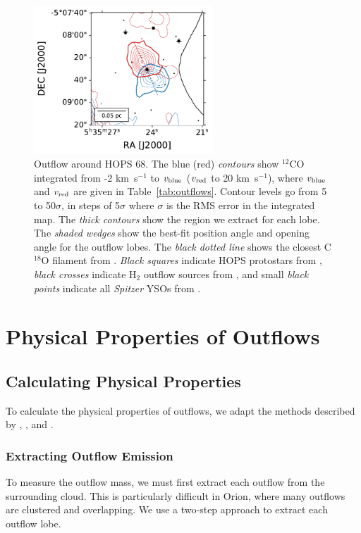 \documentclass[twocolumn]{aastex63}
\newcommand{\example}{HOPS 68}
\newcommand{\kms}{km~s$^{-1}$}
\newcommand{\co}[1][]{\ensuremath{^{#1}}CO}
\begin{document}

\begin{figure}[htb!]
\centering
\includegraphics[width=0.6\textwidth]{stamp.pdf}
\caption{Outflow around \example{}. The blue (red) \textit{contours} show \co[12]{} integrated from -2 \kms{} to $v_{\rm blue}$ ($v_{\rm red}$ to 20 \kms{}), where $v_{\rm blue}$ and $v_{\rm red}$ are given in Table~\ref{tab:outflows}. Contour levels go from 5 to 50$\sigma$, in steps of 5$\sigma$ where $\sigma$ is the RMS error in the integrated map. The \textit{thick contours} show the region we extract for each lobe. The \textit{shaded wedges} show the best-fit position angle and opening angle for the outflow lobes. The \textit{black dotted line} shows the closest C$^{18}$O filament from \citet{Suri19}. \textit{Black squares} indicate HOPS protostars from \citet{Furlan16}, \textit{black crosses} indicate H$_2$ outflow sources from \citet{Davis09}, and small \textit{black points} indicate all \emph{Spitzer} YSOs from \citet{Megeath12}.\label{fig:stamp}}
\end{figure}

\section{Physical Properties of Outflows}\label{sec:physics}
\subsection{Calculating Physical Properties}
To calculate the physical properties of outflows, we adapt the methods described by \citet{Arce01}, \citet{Dunham14}, and \citet{ZhangY16}.
\subsubsection{Extracting Outflow Emission}\label{sec:extraction}
To measure the outflow mass, we must first extract each outflow from the surrounding cloud. This is particularly difficult in Orion, where many outflows are clustered and overlapping. We use a two-step approach to extract each outflow lobe.
\end{document}

